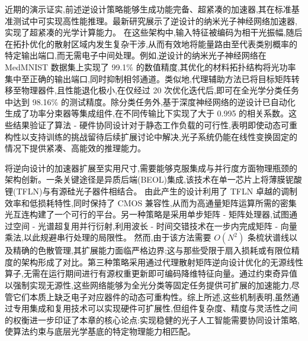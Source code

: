 \documentclass[11pt]{article}
\begin{document}
近期的演示证实,前述逆设计策略能够生成功能完备、超紧凑的加速器,其在标准基准测试中可实现高性能推理。最新研究展示了逆设计的纳米光子神经网络加速器,实现了超紧凑的光学计算能力。\citep{doi_10_1038_s41467_026_68648_1_26658a9c} 在这些架构中,输入特征被编码为相干光振幅,随后在拓扑优化的散射区域内发生复杂干涉,从而有效地将能量路由至代表类别概率的特定输出端口,而无需电子中间处理。例如,逆设计的纳米光子神经网络在 MedMNIST 数据集上实现了 99.1\% 的数值精度,其优化的材料拓扑结构将光功率集中至正确的输出端口,同时抑制相邻通道。类似地,代理辅助方法已将目标矩阵转移至物理器件,且性能退化极小,在仅经过 20 次优化迭代后,即可在全光学分类任务中达到 98.16\% 的测试精度。除分类任务外,基于深度神经网络的逆设计已自动化生成了功率分束器等集成组件,在不同传输比下实现了大于 0.995 的相关系数。这些结果验证了算法 - 硬件协同设计对于静态工作负载的可行性,表明即使动态可重构性以支持训练的挑战留待后续扩展讨论中解决,光子系统仍能在线性变换固定的情况下提供紧凑、高能效的推理能力。\citep{doi_10_1038_s41467_026_68648_1_26658a9c} \citep{s2_753a5d83a96e0194da93bcb6f20fa0bd356e37fa_c11e3796} \citep{s2_0482241c1bd933adb55a6674133d1688626bdab1_17e7627d}

将逆向设计的加速器扩展至实用尺寸,需要能够克服集成与并行度方面物理瓶颈的架构创新。一条关键途径是异质后端(BEOL)集成,该技术在单一芯片上将薄膜铌酸锂(TFLN)与有源硅光子器件相结合。\citep{s2_9b444e84d20ae6e3d62d2d4df30268b5a53baad2_40af2cc9} 由此产生的设计利用了 TFLN 卓越的调制效率和低损耗特性,同时保持了 CMOS 兼容性,从而为高通量矩阵运算所需的密集光互连构建了一个可行的平台。另一种策略是采用单步矩阵 - 矩阵处理器,试图通过空间 - 光谱超复用并行衍射,利用波长 - 时间交错技术在一步内完成矩阵 - 向量乘法,以此规避串行处理的局限性。\citep{doi_10_1038_s41467_026_68452_x_bafa2de0} 然而,由于该方法需要 \(O(N^{2})\) 条梳状谱线以及精确的色散管理,其扩展能力面临严格边界;这与那些受限于扇入损耗或有限位精度的架构形成了对比。第三种策略采用通过代理散射矩阵逆向设计优化的无源线性算子,无需在运行期间进行有源权重更新即可编码降维特征向量。通过约束奇异值以强制实现无源性,这些网络能够为全光分类等固定任务提供可扩展的加速能力,尽管它们本质上缺乏电子对应器件的动态可重构性。综上所述,这些机制表明,虽然通过专用集成和复用技术可以实现硬件可扩展性,但组件复杂度、精度与灵活性之间的权衡进一步印证了本章的核心论点:实现稳健的光子人工智能需要协同设计策略,使算法约束与底层光学基底的特定物理能力相匹配。\citep{s2_9b444e84d20ae6e3d62d2d4df30268b5a53baad2_40af2cc9} \citep{doi_10_1038_s41467_026_68452_x_bafa2de0} \citep{s2_753a5d83a96e0194da93bcb6f20fa0bd356e37fa_c11e3796}
\end{document}
